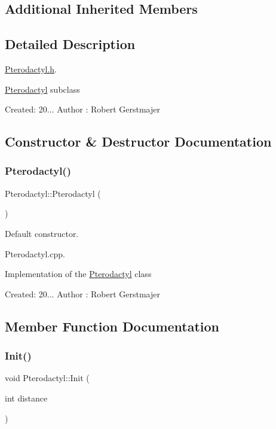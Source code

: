 \subsection*{Additional Inherited Members}


\subsection{Detailed Description}
\mbox{\hyperlink{_pterodactyl_8h_source}{Pterodactyl.\+h}}. 

\mbox{\hyperlink{class_pterodactyl}{Pterodactyl}} subclass

Created\+: 20... Author \+: Robert Gerstmajer 

\subsection{Constructor \& Destructor Documentation}
\mbox{\label{class_pterodactyl_ae667ed30c8198eae8027bf34b2f90034}} 
\subsubsection{\texorpdfstring{Pterodactyl()}{Pterodactyl()}}
{\footnotesize\ttfamily Pterodactyl\+::\+Pterodactyl (\begin{DoxyParamCaption}{ }\end{DoxyParamCaption})}



Default constructor. 

Pterodactyl.\+cpp.

Implementation of the \mbox{\hyperlink{class_pterodactyl}{Pterodactyl}} class

Created\+: 20... Author \+: Robert Gerstmajer 

\subsection{Member Function Documentation}
\mbox{\label{class_pterodactyl_a55037eb1d5ed42027e9c0cf9891b3f70}} 
\subsubsection{\texorpdfstring{Init()}{Init()}}
{\footnotesize\ttfamily void Pterodactyl\+::\+Init (\begin{DoxyParamCaption}\item[{int}]{distance }\end{DoxyParamCaption})}



